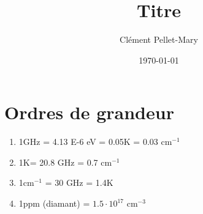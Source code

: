 \documentclass[a4paper]{article}
\title{Titre}
\author{Clément Pellet-Mary}
\date\today
\begin{document}
  \section{Ordres de grandeur}
  \begin{enumerate}
  \item 1GHz = 4.13 E-6 eV = 0.05K = 0.03 cm$^{-1}$
  \item 1K= 20.8 GHz = 0.7 cm$^{-1}$
  \item 1cm$^{-1}$ = 30 GHz = 1.4K
	\item 1ppm (diamant) = $1.5 \cdot 10^{17}$ cm$^{-3}$
  \end{enumerate}

 
  
\end{document}
